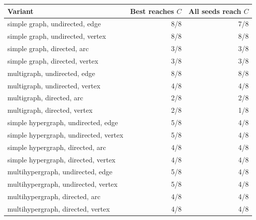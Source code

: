 \begin{tabular}{lrr}
\toprule
Variant & Best reaches $C$ & All seeds reach $C$ \\
\midrule
simple graph, undirected, edge & 8/8 & 7/8 \\
simple graph, undirected, vertex & 8/8 & 8/8 \\
simple graph, directed, arc & 3/8 & 3/8 \\
simple graph, directed, vertex & 3/8 & 3/8 \\
multigraph, undirected, edge & 8/8 & 8/8 \\
multigraph, undirected, vertex & 4/8 & 4/8 \\
multigraph, directed, arc & 2/8 & 2/8 \\
multigraph, directed, vertex & 2/8 & 1/8 \\
simple hypergraph, undirected, edge & 5/8 & 4/8 \\
simple hypergraph, undirected, vertex & 5/8 & 4/8 \\
simple hypergraph, directed, arc & 4/8 & 4/8 \\
simple hypergraph, directed, vertex & 4/8 & 4/8 \\
multihypergraph, undirected, edge & 5/8 & 4/8 \\
multihypergraph, undirected, vertex & 5/8 & 4/8 \\
multihypergraph, directed, arc & 4/8 & 4/8 \\
multihypergraph, directed, vertex & 4/8 & 4/8 \\
\bottomrule
\end{tabular}

